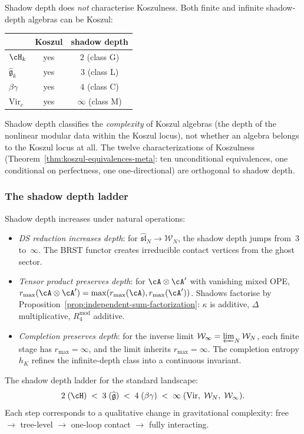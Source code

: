 Shadow depth does \emph{not} characterise Koszulness. Both
finite and infinite shadow-depth algebras can be Koszul:
\begin{center}
\renewcommand{\arraystretch}{1.15}
\begin{tabular}{lcc}
& Koszul & shadow depth \\
\hline
$\cH_k$ & yes & $2$ (class G) \\
$\widehat{\mathfrak g}_k$ & yes & $3$ (class L) \\
$\beta\gamma$ & yes & $4$ (class C) \\
$\mathrm{Vir}_c$ & yes & $\infty$ (class M)
\end{tabular}
\end{center}
Shadow depth classifies the \emph{complexity} of Koszul
algebras (the depth of the nonlinear modular data within the
Koszul locus), not whether an algebra belongs to the Koszul
locus at all. The twelve characterizations of Koszulness
(Theorem~\ref{thm:koszul-equivalences-meta}: ten unconditional
equivalences, one conditional on perfectness, one one-directional)
are orthogonal to shadow depth.

\subsubsection*{The shadow depth ladder}

Shadow depth increases under natural operations:
\begin{itemize}
\item \emph{DS reduction increases depth}: for
 $\widehat{\mathfrak{sl}}_N\to\mathcal W_N$, the shadow depth jumps
 from~$3$ to~$\infty$. The BRST functor creates irreducible
 contact vertices from the ghost sector.
\item \emph{Tensor product preserves depth}: for
 $\cA\otimes\cA'$ with vanishing mixed OPE,
 $r_{\max}(\cA\otimes\cA')
 =\max(r_{\max}(\cA),r_{\max}(\cA'))$.
 Shadows factorise by Proposition~\ref{prop:independent-sum-factorization}:
 $\kappa$ is additive, $\Delta$ multiplicative, $R_4^{\mathrm{mod}}$
 additive.
\item \emph{Completion preserves depth}: for the inverse limit
 $\mathcal W_\infty=\varprojlim_N\mathcal W_N$, each finite
 stage has $r_{\max}=\infty$, and the limit inherits
 $r_{\max}=\infty$. The completion entropy $h_K$ refines the
 infinite-depth class into a continuous invariant.
\end{itemize}

The shadow depth ladder for the standard landscape:
\[
2\;(\cH)\;<\;3\;(\widehat{\mathfrak g})\;<\;4\;(\beta\gamma)
\;<\;\infty\;(\mathrm{Vir},\;\mathcal W_N,\;\mathcal W_\infty).
\]
Each step corresponds to a qualitative change in gravitational
complexity: free $\to$ tree-level $\to$ one-loop contact
$\to$ fully interacting.

